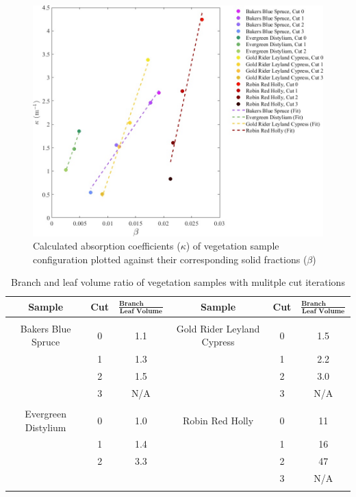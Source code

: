 \documentclass[12pt]{article}
\newcommand*\textfrac[2]{
  \frac{\textbf{#1}}{\textbf{#2}}
}
\begin{document}
\begin{figure}[!]
	\centering 	
    \includegraphics[width=1\linewidth]{Picture12.jpg}
	\caption[Comparison of absorption coefficient, $\kappa$, and solid fraction, $\beta$]{Calculated absorption coefficients ($\kappa$) of vegetation sample configuration plotted against their corresponding solid fractions ($\beta$)}
	\label{fig:betavkappa}
\end{figure}



\begin{table}[!]
\caption[Branch and leaf volume ratio of vegetation samples]{Branch and leaf volume ratio of vegetation samples with mulitple cut iterations}
\label{tab:RatioTable}
\centering
	
	\begin{tabular}{cccccc}	
			\hline
\rule{0pt}{14pt}\textbf{Sample}	&\textbf{Cut}	& ${\textfrac{Branch Volume}{Leaf Volume}}$ 	&\textbf{Sample}			&	\textbf{Cut}	& $\textfrac{Branch Volume}{Leaf Volume}$	\\
\hline
\\[0.01cm]
Bakers Blue Spruce			&	0		&        1.1							&Gold Rider Leyland Cypress	&	0		&	1.5						\\
					&	1		& 	1.3							&					&	1		&	2.2						\\
					&	2		& 	1.5							&					&	2		&	3.0						\\
					&	3		&	N/A							&					&	3		&  	N/A 						\\
					&			&								&					&			&       							\\
Evergreen Distylium			&	0		&	1.0							&Robin Red Holly			&	0		&	11						\\
					&	1		&	1.4							&					&	1		&	16						\\
					&	2		&	3.3							&					&	2		&	47						\\
					&			&								&					&	3		&        N/A 						\\
\\[0.005cm]
\hline														

\end{tabular}
\end{table}
\end{document}
